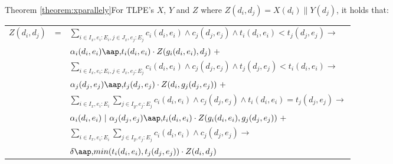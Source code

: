 \\
\begin{proofenv}{Theorem \ref{theorem:xparallely}}For TLPE's $X$, $Y$ and $Z$ where $Z(d_i, d_j) = X(d_i) \parallel Y(d_j)$, it holds that: \\
\begin{tabular}{lll}
$Z(d_i, d_j)$ & = & $\sum_{i \in I_x, e_i: E_i, j \in J_x, e_j: E_j} c_i(d_i,e_i) \land c_j(d_j,e_j) \land t_i(d_i,e_i) < t_j(d_j,e_j) \rightarrow$ \\
& & $\alpha_i(d_i,e_i) \at t_i(d_i,e_i) \cdot Z(g_i(d_i,e_i), d_j)~+$ \\
& & $\sum_{i \in I_x, e_i: E_i, j \in J_x, e_j: E_j} c_i(d_i,e_i) \land c_j(d_j,e_j) \land t_j(d_j,e_j) < t_i(d_i,e_i) \rightarrow$ \\
& & $\alpha_j(d_j,e_j) \at t_j(d_j,e_j) \cdot Z(d_i, g_j(d_j,e_j))~+$ \\
& & $\sum_{i \in I_x, e_i: E_i} \sum_{j \in I_y, e_j: E_j} c_i(d_i,e_i) \land c_j(d_j,e_j) \land t_i(d_i,e_i) = t_j(d_j,e_j) \rightarrow$ \\
& & $\alpha_i(d_i,e_i) \comm \alpha_j(d_j,e_j) \at t_i(d_i,e_i) \cdot Z(g_i(d_i,e_i), g_j(d_j,e_j))~+$ \\
& & $\sum_{i \in I_x, e_i: E_i} \sum_{j \in I_y, e_j: E_j} c_i(d_i,e_i) \land c_j(d_j,e_j) \rightarrow$ \\
& & $\delta \at min(t_i(d_i,e_i), t_j(d_j,e_j)) \cdot Z(d_i,d_j)$ \\
\end{tabular}
\end{proofenv}

